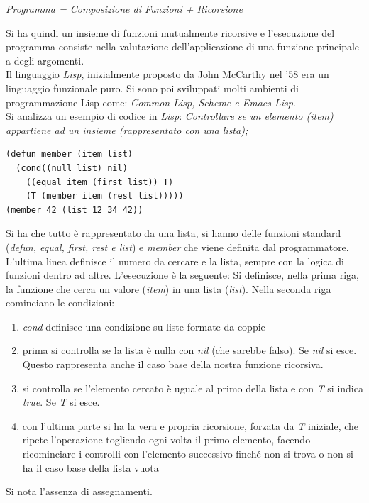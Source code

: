 \documentclass[a4paper,12pt, oneside]{book}
\begin{document}
\begin{enumerate}
	      \begin{center}
		      \textit{Programma = Composizione di Funzioni + Ricorsione}
	      \end{center}
	      Si ha quindi un insieme di funzioni mutualmente ricorsive e l'esecuzione del programma consiste nella valutazione dell'applicazione di una funzione principale a degli argomenti.\\
	      Il linguaggio \textit{Lisp}, inizialmente proposto da John McCarthy nel '58 era un linguaggio funzionale puro. Si sono poi sviluppati molti ambienti di programmazione Lisp come: \textit{Common Lisp, Scheme e Emacs Lisp}.\\
	      Si analizza un esempio di codice in \textit{Lisp}:
	      \textit{Controllare se un elemento (item) appartiene ad un insieme (rappresentato con una lista);}
	      \begin{verbatim}
(defun member (item list)
  (cond((null list) nil)
    ((equal item (first list)) T)
    (T (member item (rest list)))))
(member 42 (list 12 34 42))
\end{verbatim}
	      Si ha che tutto è rappresentato da una lista, si hanno delle funzioni standard (\textit{defun, equal, first, rest e list}) e \textit{member} che viene definita dal programmatore. L'ultima linea definisce il numero da cercare e la lista, sempre con la logica di funzioni dentro ad altre. L'esecuzione è la seguente: Si definisce, nella prima riga, la funzione che cerca un valore (\textit{item}) in una lista (\textit{list}). Nella seconda riga cominciano le condizioni:
	      \begin{enumerate}
		      \item \textit{cond} definisce una condizione su liste formate da coppie
		      \item prima si controlla se la lista è nulla con \textit{nil} (che sarebbe falso). Se \textit{nil} si esce. Questo rappresenta anche il caso base della nostra funzione ricorsiva.
		      \item si controlla se l'elemento cercato è uguale al primo della lista e con \textit{T} si indica \textit{true}. Se \textit{T} si esce.
		      \item con l'ultima parte si ha la vera e propria ricorsione, forzata da \textit{T} iniziale, che ripete l'operazione togliendo ogni volta il primo elemento, facendo ricominciare i controlli con l'elemento successivo finché non si trova o non si ha il caso base della lista vuota
	      \end{enumerate}
	      Si nota l'assenza di assegnamenti.
\end{enumerate}
\end{document}

